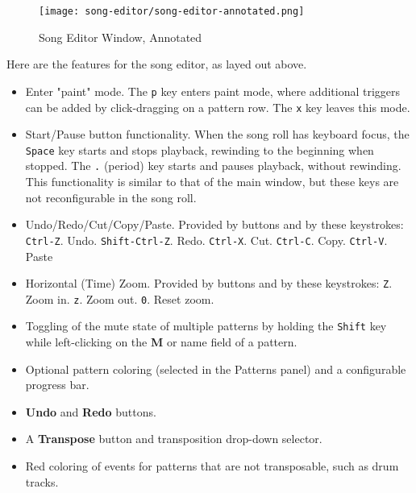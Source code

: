 \begin{figure}[H]
   \centering 
   \texttt{[image: song-editor/song-editor-annotated.png]}
   \caption{Song Editor Window, Annotated}
   \label{fig:song_editor_window_annotated}
\end{figure}

   Here are the features for the song editor, as layed out above.

   \begin{itemize}
      \item Enter "paint" mode.
         The \texttt{p} key enters paint mode, where additional triggers
         can be added by click-dragging on a pattern row.
         The \texttt{x} key leaves this mode.
      \item Start/Pause button functionality.
         When the song roll has keyboard focus,
         the \texttt{Space} key starts and stops playback, rewinding to the
         beginning when stopped.
         The \texttt{.} (period) key starts and pauses playback, without
         rewinding.
         This functionality is similar to that of the main window, but
         these keys are not reconfigurable in the song roll.
      \item Undo/Redo/Cut/Copy/Paste.
         Provided by buttons and by these keystrokes:
         \texttt{Ctrl-Z}. Undo.
         \texttt{Shift-Ctrl-Z}. Redo.
         \texttt{Ctrl-X}. Cut.
         \texttt{Ctrl-C}. Copy.
         \texttt{Ctrl-V}. Paste
      \item Horizontal (Time) Zoom.
         Provided by buttons and by these keystrokes:
         \texttt{Z}. Zoom in.
         \texttt{z}. Zoom out.
         \texttt{0}. Reset zoom.
   \end{itemize}

   \begin{itemize}
      \item Toggling of the mute state of multiple patterns by holding the
         \texttt{Shift} key while left-clicking on the \textbf{M}
         or name field of a pattern.
      \item Optional pattern coloring (selected in the Patterns panel)
         and a configurable progress bar.
      \item \textbf{Undo} and \textbf{Redo} buttons.
      \item A \textbf{Transpose} button and transposition drop-down selector.
      \item Red coloring of events for patterns that are not transposable, such
         as drum tracks.
   \end{itemize}


